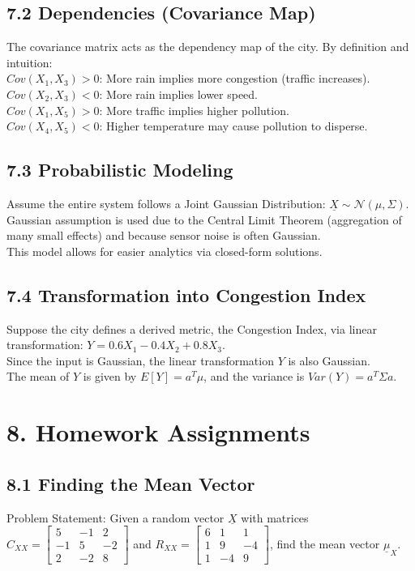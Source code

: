 \documentclass[12pt]{article}
\begin{document}
\subsection*{7.2 Dependencies (Covariance Map)}
The covariance matrix acts as the dependency map of the city. By definition and intuition: \\
$Cov(X_{1}, X_{3}) > 0$: More rain implies more congestion (traffic increases). \\
$Cov(X_{2}, X_{3}) < 0$: More rain implies lower speed. \\
$Cov(X_{1}, X_{5}) > 0$: More traffic implies higher pollution. \\
$Cov(X_{4}, X_{5}) < 0$: Higher temperature may cause pollution to disperse.

\subsection*{7.3 Probabilistic Modeling}
Assume the entire system follows a Joint Gaussian Distribution: $\underline{X} \sim \mathcal{N}(\mu, \Sigma)$. \\
Gaussian assumption is used due to the Central Limit Theorem (aggregation of many small effects) and because sensor noise is often Gaussian. \\
This model allows for easier analytics via closed-form solutions.

\subsection*{7.4 Transformation into Congestion Index}
Suppose the city defines a derived metric, the Congestion Index, via linear transformation: $Y = 0.6X_{1} - 0.4X_{2} + 0.8X_{3}$. \\
Since the input is Gaussian, the linear transformation $Y$ is also Gaussian. \\
The mean of $Y$ is given by $E[Y]=a^{T}\mu$, and the variance is $Var(Y)=a^{T}\Sigma a$.

\section*{8. Homework Assignments}
\subsection*{8.1 Finding the Mean Vector}
Problem Statement: Given a random vector $\underline{X}$ with matrices $C_{XX} = \begin{bmatrix} 5 & -1 & 2 \\ -1 & 5 & -2 \\ 2 & -2 & 8 \end{bmatrix}$ and $R_{XX} = \begin{bmatrix} 6 & 1 & 1 \\ 1 & 9 & -4 \\ 1 & -4 & 9 \end{bmatrix}$, find the mean vector $\underline{\mu}_{X}$. 
\end{document}
